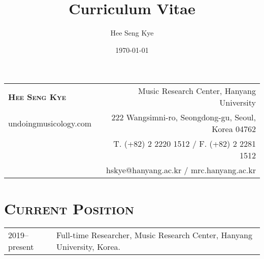 \documentclass[a4paper,11pt]{article}
\title{Curriculum Vitae}
\author{Hee Seng Kye}
\date{\today}
\begin{document}
  \renewcommand{\headrulewidth}{0pt}
  \fancyhf{}
 
  \fancyfoot[RE,RO]{\small \thepage}
  
  \raggedright \parindent=15pt
  
%  
%  
  
  \hspace*{-0.8cm}
  \begin{tabular}{p{7.26cm} r}
    {\LARGE \textsc{\textbf{Hee Seng Kye}}} & Music Research Center, Hanyang University\\
    undoingmusicology.com & 222 Wangsimni-ro, Seongdong-gu, Seoul, Korea 04762\\
    & T. (+82) 2 2220 1512 / F. (+82) 2 2281 1512\\
    & hskye@hanyang.ac.kr / mrc.hanyang.ac.kr
  \end{tabular}
  
  \vspace{5mm}
  
  \section*{\textsc{Current Position}}
  
  \hspace*{-0.25cm}
  \begin{tabular}{p{2.5cm} l}
    2019--present & Full-time Researcher, Music Research Center, Hanyang University, Korea.
  \end{tabular}
  
  \vspace*{2.5mm}
  
%  
%  
  
\end{document}
